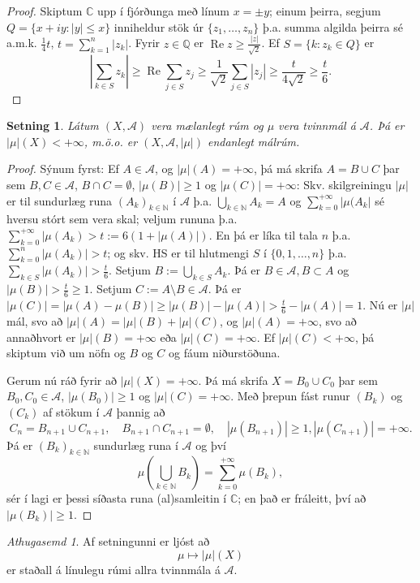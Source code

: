 \documentclass[a4paper,icelandic,11pt]{book}
\theoremstyle{plain}      \newtheorem{setn}{Setning}[chapter]
\theoremstyle{definition} \newtheorem{skilgr}[setn]{Skilgreining}
\theoremstyle{remark}     \newtheorem*{ath}{Athugasemd}
\newcommand{\C}{\mathbb C}
\newcommand{\Q}{\mathbb Q}
\newcommand{\N}{\mathbb N}
\DeclareMathOperator{\re}{Re}
\begin{document}
\begin{proof}
  Skiptum $\C$ upp í fjórðunga með línum $x=\pm y$; einum þeirra,
  segjum $Q = \{ x + iy : |y|\le x \}$ inniheldur stök úr $\{
  z_{1},\dots,z_{n}\}$ þ.a. summa algilda þeirra sé a.m.k. $\frac
  14t$, $t = \sum_{k=1}^{n}|z_{k}|$. Fyrir $z\in\Q$ er $\re z\ge
  \frac{|z|}{\sqrt{2}}$. Ef $S = \{k:z_{k}\in Q\}$ er 
  \[
  \left|
    \sum_{k\in S} z_{k}
  \right|
  \ge \re \sum_{j\in S} z_{j}
  \ge \frac 1{\sqrt 2} \sum_{j\in S} |z_{j}|
  \ge \frac t{4\sqrt 2}
  \ge \frac t6.
  \]
\end{proof}
\begin{setn}
  Látum $(X,\mathcal A)$ vera mælanlegt rúm og $\mu$ vera tvinnmál á
  $\mathcal A$. Þá er $|\mu|(X)<+\infty$, m.ö.o. er $(X,\mathcal
  A,|\mu|)$ endanlegt málrúm.
\end{setn}
\begin{proof}
  Sýnum fyrst: Ef $A\in\mathcal A$, og $|\mu|(A) = +\infty$, þá má
  skrifa $A=B\cup C$ þar sem $B,C\in\mathcal A$, $B\cap C=\emptyset$,
  $|\mu(B)|\ge 1$ og $|\mu(C)|=+\infty$: Skv. skilgreiningu $|\mu|$ er
  til sundurlæg runa $(A_{k})_{k\in\N}$ í $\mathcal A$
  þ.a. $\bigcup_{k\in\N}A_{k}=A$ og $\sum_{k=0}^{+\infty}|\mu(A_{k}|$
  sé hversu stórt sem vera skal; veljum rununa
  þ.a. $\sum_{k=0}^{+\infty}|\mu(A_{k})>t := 6(1+|\mu(A)|)$. En þá er
  líka til tala $n$ þ.a. $\sum_{k=0}^{n}|\mu(A_{k})|>t$; og skv. HS er
  til hlutmengi $S$ í $\{0,1,\dots,n\}$ þ.a. $\sum_{k\in
    S}|\mu(A_{k})|>\frac t6$. Setjum $B:=\bigcup_{k\in S}A_{k}$. Þá
  er $B\in\mathcal A, B\subset A$ og $|\mu(B)|>\frac t6 \ge 1$. Setjum
  $C:=A\setminus B\in\mathcal A$. Þá er
  $|\mu(C)|=|\mu(A)-\mu(B)|\ge|\mu(B)|-|\mu(A)|>\frac t6 - |\mu(A)| =
  1$. Nú er $|\mu|$ mál, svo að $|\mu|(A)=|\mu|(B)+|\mu|(C)$, og
  $|\mu|(A)=+\infty$, svo að annaðhvort er $|\mu|(B)=+\infty$ eða
  $|\mu|(C)=+\infty$.  Ef $|\mu|(C)<+\infty$, þá skiptum við um nöfn
  og $B$ og $C$ og fáum niðurstöðuna.

  Gerum nú ráð fyrir að $|\mu|(X) = +\infty$. Þá má skrifa
  $X=B_{0}\cup C_{0}$ þar sem $B_{0},C_{0}\in\mathcal A$,
  $|\mu(B_{0})|\ge 1$ og $|\mu|(C)=+\infty$. Með þrepun fást runur
  $(B_{k})$ og $(C_{k})$ af stökum í $\mathcal A$ þannig að 
  \[
  C_{n} = B_{n+1}\cup C_{n+1},
  \quad
  B_{n+1}\cap C_{n+1} = \emptyset,
  \quad
  |\mu(B_{n+1})|\ge 1,
  |\mu(C_{n+1})| = +\infty.
  \]
  Þá er $(B_{k})_{k\in\N}$ sundurlæg runa í $\mathcal A$ og því 
  \[
  \mu\left(\bigcup_{k\in\N}B_{k}\right)
  = \sum_{k=0}^{+\infty}\mu(B_{k}),
  \]
  sér í lagi er þessi síðasta runa (al)samleitin í $\C$; en það er
  fráleitt, því að $|\mu(B_{k})|\ge 1$.
\end{proof}
\begin{ath}
  Af setningunni er ljóst að 
  \[
  \mu\mapsto |\mu|(X)
  \]
  er staðall á línulegu rúmi allra tvinnmála á $\mathcal A$.
\end{ath}
\end{document}
